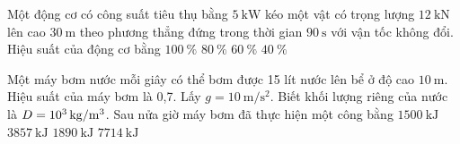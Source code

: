 \begin{ex}
	Một động cơ có công suất tiêu thụ bằng $\SI{5}{\kilo\watt}$ kéo một vật có trọng lượng $\SI{12}{\kilo\newton}$ lên cao $\SI{30}{\meter}$ theo phương thẳng đứng trong thời gian $\SI{90}{\second}$ với vận tốc không đổi. Hiệu suất của động cơ bằng
	\choice
	{$\SI{100}{\percent}$}
	{\True $\SI{80}{\percent}$}
	{$\SI{60}{\percent}$}
	{$\SI{40}{\percent}$}
\end{ex}
\begin{ex}
Một máy bơm nước mỗi giây có thể bơm được 15 lít nước lên bể ở độ cao $\SI{10}{\meter}$. Hiệu suất của máy bơm là 0,7. Lấy $g=\SI{10}{\meter/\second^2}$. Biết khối lượng riêng của nước là  $D=\SI{E3}{\kilogram/\meter^3}$. Sau nửa giờ máy bơm đã thực hiện một công bằng	
	\choice
	{$\SI{1500}{\kilo\joule}$}
	{\True $\SI{3857}{\kilo\joule}$}
	{$\SI{1890}{\kilo\joule}$}
	{$\SI{7714}{\kilo\joule}$}
\end{ex}
